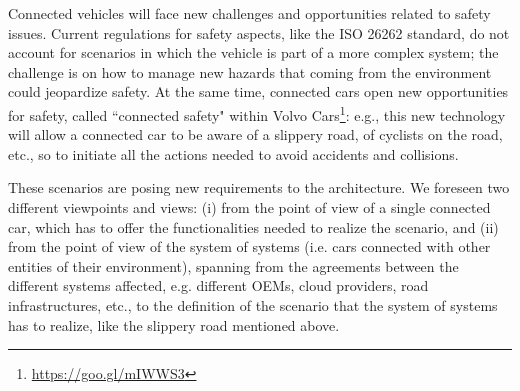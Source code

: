 Connected vehicles will face new challenges and opportunities related to safety issues.
Current %
regulations for safety aspects, like the ISO 26262 standard, do not account for scenarios in which the %
vehicle is part of a more complex system; the challenge is on how to manage new hazards that coming from the environment could jeopardize safety. 
At the same time, connected cars open new opportunities for safety, called ``connected safety" within Volvo Cars\footnote{\url{https://goo.gl/mIWWS3}}: %
e.g., this new technology will allow a connected car to be aware of a slippery road, of cyclists on the road, etc., so to initiate all the actions needed to avoid accidents and collisions. 
%

These scenarios are posing new requirements to the architecture. %
We foreseen two different viewpoints and views: (i) %
from the point of view of a single connected car, which has to offer the functionalities needed to realize the scenario, and (ii) %
from the point of view of the system of systems  (i.e. cars connected with other entities of their environment), spanning from the agreements between the different systems affected, e.g. different OEMs, cloud providers, road infrastructures, etc., to the definition of the scenario that the system of systems has to realize, like the slippery road mentioned above. 

